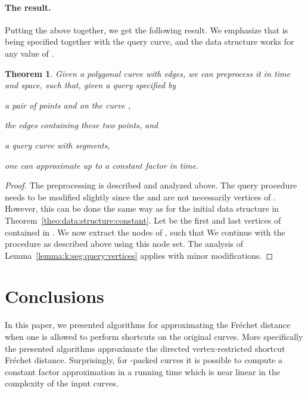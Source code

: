 \documentclass[12pt]{article}
\newtheorem{theorem}{Theorem}[section]
\newcommand{\seclab}[1]{\label{sec:#1}}
\newcommand{\thmlab}[1]{{\label{theo:#1}}}
\newcommand{\thmref}[1]{Theorem~\ref{theo:#1}}
\newcommand{\lemref}[1]{Lemma~\ref{lemma:#1}}
\newcommand{\Frechet}{Fr\'{e}c{h}e{}t\xspace}\providecommand{\Arr}{\mathop{\mathrm{\EuScript{A}}}}
\numberwithin{figure}{section}
\numberwithin{equation}{section}
\newcommand{\vrestricted}{vertex-restricted}
\newcommand{\asymmetric}{directed}
\begin{document}
\paragraph{The result.}
Putting the above together, we get the following result. We emphasize
that  is being specified together with the query curve, and the
data structure works for any value of .

\begin{theorem}
    \thmlab{k:seg:query:result}Given a polygonal curve  with  edges, we can preprocess it
    in  time and  space, such that, given
    a query specified by
    \begin{compactenum}[\quad(i)]
        \item a pair of points  and  on the curve ,
        \item the edges containing these two points, and
        \item a query curve  with  segments,
    \end{compactenum}
    one can approximate  up to a
    constant factor in  time.
\end{theorem}

\begin{proof}
    The preprocessing is described and analyzed above. The query
    procedure needs to be modified slightly since the  and  are
    not necessarily vertices of . However, this can be done the
    same way as for the initial data structure in
    \thmref{data:structure:constant}.  Let  be the first and
    last vertices of  contained in . We now
    extract the  nodes  of
    , such that
     We continue with the procedure as described
    above using this node set.  The analysis of
    \lemref{k:seg:query:vertices} applies with minor modifications.
\end{proof}






\section{Conclusions}
\seclab{conclusions}


In this paper, we presented algorithms for approximating the \Frechet
distance when one is allowed to perform shortcuts on the original
curves. More specifically the presented algorithms approximate the
\asymmetric{} \vrestricted{} shortcut \Frechet distance.
Surprisingly, for -packed curves it is possible to compute a
constant factor approximation in a running time which is near linear
in the complexity of the input curves.
\end{document}

